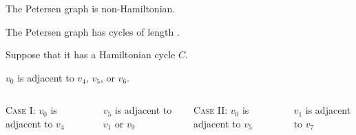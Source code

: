 \begin{frame}{}
  \begin{theorem}{}
    The Petersen graph is non-Hamiltonian.
  \end{theorem}


  \pause
  \begin{center}
    The Petersen graph has  cycles of length .
  \end{center}
\end{frame}

\begin{frame}{}
  \begin{center}

    \pause
    \vspace{0.30cm}
    Suppose that it has a Hamiltonian cycle $C$.


    \pause
    $v_{0}$ is adjacent to $v_{4}$, $v_{5}$, or $v_{6}$.
  \end{center}
\end{frame}

\begin{frame}{}
  \begin{columns}
      \begin{center}
        \textsc{Case I:} $v_{0}$ is adjacent to $v_{4}$
      \end{center}

      \pause
      \begin{center}
        $v_{5}$ is adjacent to $v_{1}$ or $v_{9}$

        \pause
        \vspace{0.30cm}
      \end{center}
      \pause
      \begin{center}
        \textsc{Case II:} $v_{0}$ is adjacent to $v_{5}$
      \end{center}

      \pause
      \begin{center}
        $v_{1}$ is adjacent to $v_{7}$

        \pause
        \vspace{0.30cm}
      \end{center}
  \end{columns}
\end{frame}
